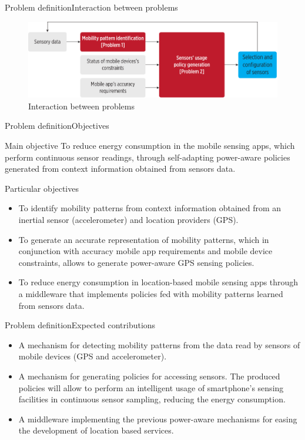 \documentclass[10pt,xcolor={dvipsnames}]{beamer}
\begin{document}
\begin{frame}{Problem definition}{Interaction between problems}
\begin{figure}[tb]
  \centering
  \includegraphics[width=\textwidth]{../../../resources/images/vectors/problems-incorporation}
  \caption{Interaction between problems}
  \label{fig:problems-incorporation}
\end{figure}
\end{frame}

\begin{frame}{Problem definition}{Objectives}
\begin{exampleblock}{Main objective}
To reduce energy consumption in the mobile sensing apps, which perform continuous sensor readings, through self-adapting power-aware policies generated from context information obtained from sensors data.
\end{exampleblock}
\pause
\begin{exampleblock}{Particular objectives}
\small
\begin{itemize}
  \item To identify mobility patterns from context information obtained from an inertial sensor (accelerometer) and location providers (GPS).
  \pause
  \item To generate an accurate representation of mobility patterns, which in conjunction with accuracy mobile app requirements and mobile device constraints, allows to generate power-aware GPS sensing policies.
  \pause
  \item To reduce energy consumption in location-based mobile sensing apps through a middleware that implements policies fed with mobility patterns learned from sensors data.
\end{itemize}
\end{exampleblock}
\end{frame}

\begin{frame}{Problem definition}{Expected contributions}
\begin{itemize}
  \item<+-> A mechanism for detecting mobility patterns from the data read by sensors of mobile devices (GPS and accelerometer).
  \item<+-> A mechanism for generating policies for accessing sensors.
  The produced policies will allow to perform an intelligent usage of smartphone's sensing facilities in continuous sensor sampling, reducing the energy consumption.
  \item<+-> A middleware implementing the previous power-aware mechanisms for easing the development of location based services.
\end{itemize}
\end{frame}
\end{document}
